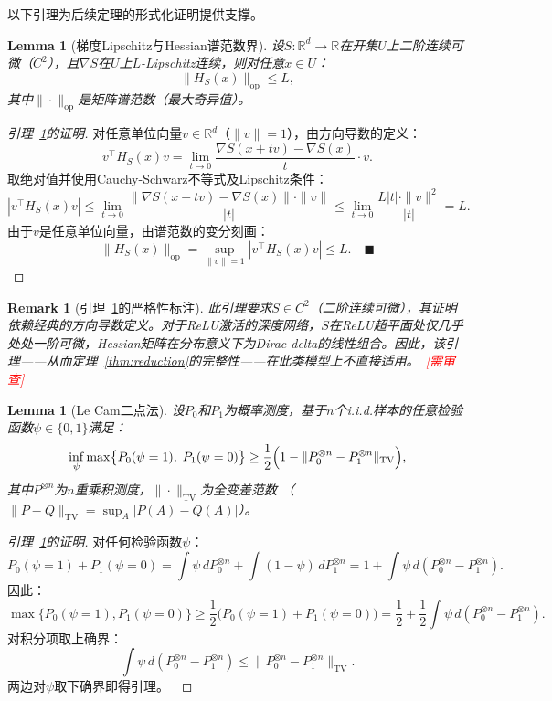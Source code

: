 \documentclass[12pt,a4paper]{article}
\newtheorem{lemma}[theorem]{Lemma}
\newtheorem{remark}[theorem]{Remark}
\newcommand{\critical}{\textcolor{red}{\small\textsf{[需审查]}}}
\newcommand{\R}{\mathbb{R}}
\newcommand{\TV}{\mathrm{TV}}
\newcommand{\op}{\mathrm{op}}
\begin{document}

以下引理为后续定理的形式化证明提供支撑。

\begin{lemma}[梯度Lipschitz与Hessian谱范数界]
\label{lem:hessian-bound}
设$S: \R^d \to \R$在开集$U$上二阶连续可微（$C^2$），且$\nabla S$在$U$上$L$-Lipschitz连续，则对任意$x \in U$：
\[
\|H_S(x)\|_{\op} \leq L,
\]
其中$\|\cdot\|_{\op}$是矩阵谱范数（最大奇异值）。
\end{lemma}

\begin{proof}[引理~\ref{lem:hessian-bound}的证明]
对任意单位向量$v \in \R^d$（$\|v\| = 1$），由方向导数的定义：
\[
v^\top H_S(x) v = \lim_{t \to 0} \frac{\nabla S(x+tv) - \nabla S(x)}{t} \cdot v.
\]
取绝对值并使用Cauchy-Schwarz不等式及Lipschitz条件：
\[
|v^\top H_S(x) v| \leq \lim_{t \to 0} \frac{\|\nabla S(x+tv) - \nabla S(x)\| \cdot \|v\|}{|t|}
                 \leq \lim_{t \to 0} \frac{L |t| \cdot \|v\|^2}{|t|} = L.
\]
由于$v$是任意单位向量，由谱范数的变分刻画：
\[
\|H_S(x)\|_{\op} = \sup_{\|v\|=1} |v^\top H_S(x) v| \leq L.
\quad\blacksquare
\]
\end{proof}

\begin{remark}[引理~\ref{lem:hessian-bound}的严格性标注]
此引理要求$S \in C^2$（二阶连续可微），其证明依赖经典的方向导数定义。对于ReLU激活的深度网络，$S$在ReLU超平面处仅几乎处处一阶可微，Hessian矩阵在分布意义下为Dirac delta的线性组合。因此，该引理——从而定理~\ref{thm:reduction}的完整性——在此类模型上不直接适用。~\critical
\end{remark}

\begin{lemma}[Le Cam二点法]
\label{lem:lecam}
设$P_0$和$P_1$为概率测度，基于$n$个i.i.d.样本的任意检验函数$\psi \in \{0,1\}$满足：
\[
\inf_{\psi} \max\bigl\{ P_0(\psi=1),\; P_1(\psi=0) \bigr\}
   \geq \frac12 \Bigl(1 - \|P_0^{\otimes n} - P_1^{\otimes n}\|_{\TV}\Bigr),
\]
其中$P^{\otimes n}$为$n$重乘积测度，$\|\cdot\|_{\TV}$为全变差范数
（$\|P-Q\|_{\TV} = \sup_{A} |P(A)-Q(A)|$）。
\end{lemma}

\begin{proof}[引理~\ref{lem:lecam}的证明]
对任何检验函数$\psi$：
\[
P_0(\psi=1) + P_1(\psi=0) = \int \psi \, dP_0^{\otimes n} + \int (1-\psi) \, dP_1^{\otimes n}
= 1 + \int \psi \, d(P_0^{\otimes n} - P_1^{\otimes n}).
\]
因此：
\[
\max\{P_0(\psi=1), P_1(\psi=0)\}
   \geq \frac12 \bigl( P_0(\psi=1) + P_1(\psi=0) \bigr)
   = \frac12 + \frac12 \int \psi \, d(P_0^{\otimes n} - P_1^{\otimes n}).
\]
对积分项取上确界：
\[
\int \psi \, d(P_0^{\otimes n} - P_1^{\otimes n}) \leq \|P_0^{\otimes n} - P_1^{\otimes n}\|_{\TV}.
\]
两边对$\psi$取下确界即得引理。~\blacksquare
\end{proof}
\end{document}
